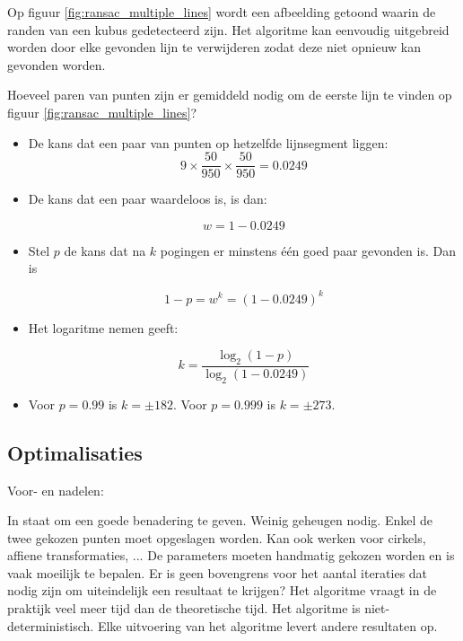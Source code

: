 Op figuur \ref{fig:ransac_multiple_lines} wordt een afbeelding getoond waarin de randen van een kubus gedetecteerd zijn. Het algoritme kan eenvoudig uitgebreid worden door elke gevonden lijn te verwijderen zodat deze niet opnieuw kan gevonden worden. 

Hoeveel paren van punten zijn er gemiddeld nodig om de eerste lijn te vinden op figuur \ref{fig:ransac_multiple_lines}?
\begin{itemize}
	\item De kans dat een paar van punten op hetzelfde lijnsegment liggen:
	$$9 \times \frac{50}{950} \times \frac{50}{950} = 0.0249$$
	\item De kans dat een paar waardeloos is, is dan:
	
	$$w = 1 - 0.0249$$
	
	\item Stel $p$ de kans dat na $k$ pogingen er minstens één goed paar gevonden is. Dan is 
	
	$$1 - p = w^k = (1 - 0.0249)^k$$
	
	\item Het logaritme nemen geeft:
	
	$$k = \frac{\log_2(1 - p)}{\log_2(1 - 0.0249)}$$
	
	\item Voor $p = 0.99$ is $ k = \pm 182$. Voor $p = 0.999$ is $k = \pm 273$.
\end{itemize}

\subsection{Optimalisaties}
Voor- en nadelen:
\begin{itemize}
	\good In staat om een goede benadering te geven. 
	\good Weinig geheugen nodig. Enkel de twee gekozen punten moet opgeslagen worden.
	\good Kan ook werken voor cirkels, affiene transformaties, ... 
	\alert De parameters moeten handmatig gekozen worden en is vaak moeilijk te bepalen.
	\alert Er is geen bovengrens voor het aantal iteraties dat nodig zijn om uiteindelijk een resultaat te krijgen?
	\alert Het algoritme vraagt in de praktijk veel meer tijd dan de theoretische tijd.
	\alert Het algoritme is niet-deterministisch. Elke uitvoering van het algoritme levert andere resultaten op.
\end{itemize}

